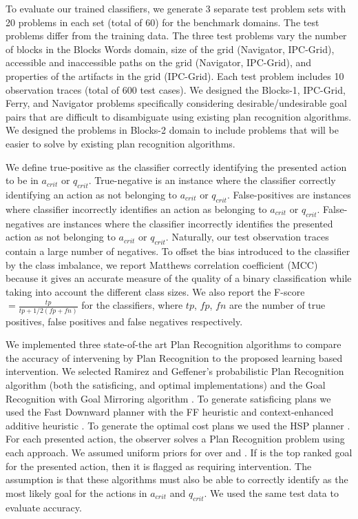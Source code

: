 To evaluate our trained classifiers, we generate 3 separate test problem sets with 20 problems in each set (total of 60) 
for the benchmark domains.
The test problems differ from the training data. 
The three test problems vary the number of blocks in the Blocks Words domain, size of the grid (Navigator, IPC-Grid), accessible and inaccessible paths on the grid (Navigator, IPC-Grid), and properties of the artifacts in the grid (IPC-Grid). 
Each test problem includes 10 observation traces (total of 600 test cases).  
We designed the Blocks-1, IPC-Grid, Ferry, and Navigator problems specifically considering desirable/undesirable goal pairs that are difficult to disambiguate using existing plan recognition algorithms.
We designed the problems in Blocks-2 domain to include problems that will be easier to solve by existing plan recognition algorithms.


We define true-positive as the classifier correctly identifying the presented action to be in $a_{crit}$ or $q_{crit}$. 
True-negative is an instance where the classifier  correctly identifying an action as not belonging to $a_{crit}$ or $q_{crit}$. False-positives are instances where classifier incorrectly identifies an action as belonging to $a_{crit}$ or $q_{crit}$. False-negatives are instances where the classifier incorrectly identifies the presented action as not belonging to $a_{crit}$ or $q_{crit}$. 
Naturally, our test observation traces contain a large number of negatives. 
To offset the bias introduced to the classifier by the class imbalance, we report Matthews correlation coefficient (MCC) because it gives an accurate measure of the quality of a binary classification while taking into account the different class sizes.
 We also report the F-score $= \frac{tp}{tp+1/2(fp+fn)}$ for the classifiers, where $tp$, $fp$, $fn$ are the number of true positives, false positives and false negatives respectively.


We implemented three state-of-the art Plan Recognition algorithms to compare the accuracy of intervening by Plan Recognition to the proposed learning based intervention. 
We selected Ramirez and Geffener's probabilistic Plan Recognition algorithm \cite{ramirez2010probabilistic} (both the satisficing, and optimal implementations) and the Goal Recognition with Goal Mirroring algorithm \cite{vered2018goalrec}. 
To generate satisficing plans we used the Fast Downward planner with the FF heuristic and context-enhanced additive heuristic \cite{helmert2006}.
To generate the optimal cost plans we used the HSP planner \cite{bonet01planningas}.
For each presented action, the observer solves a Plan Recognition problem using each approach. 
We assumed uniform priors for over \undesired and \desired. 
If \undesired is the top ranked goal for the presented action, then it is flagged as requiring intervention. 
The assumption is that these algorithms must also be able to correctly identify \undesired as the most likely goal for the actions in $a_{crit}$ and $q_{crit}$. 
We used the same test data to evaluate accuracy.

